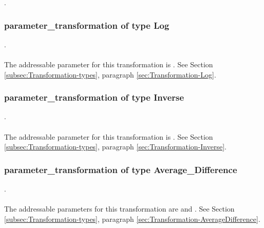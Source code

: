 .
\label{syntax:Transformation}





\subsubsection{parameter\_transformation of type Log}
.
\label{syntax:Transformation-Log} \\ \\
The addressable parameter for this transformation is . See Section \ref{subsec:Transformation-types}, paragraph \ref{sec:Transformation-Log}.

\subsubsection{parameter\_transformation of type Inverse}
.
\label{syntax:Transformation-Inverse}  \\ \\
The addressable parameter for this transformation is . See Section \ref{subsec:Transformation-types}, paragraph \ref{sec:Transformation-Inverse}.

\subsubsection{parameter\_transformation of type Average\_Difference}
.
\label{syntax:Transformation-AverageDifference} \\ \\
The addressable parameters for this transformation are  and . See Section \ref{subsec:Transformation-types}, paragraph \ref{sec:Transformation-AverageDifference}.

